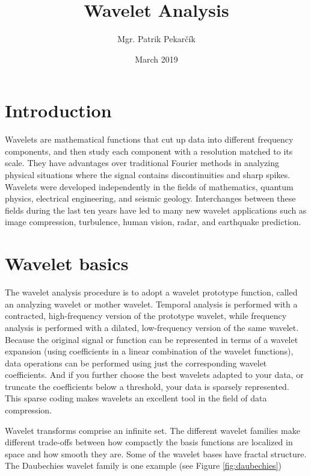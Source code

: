 \documentclass{article}
\title{Wavelet Analysis}
\author{Mgr. Patrik Pekarčík}
\date{March 2019}
\begin{document}
\maketitle

\section{Introduction}
Wavelets are mathematical functions that cut up data into different frequency components, and then study each component with a resolution matched to its scale. 
They have advantages over traditional Fourier methods in analyzing physical situations where the signal contains discontinuities and sharp spikes. 
Wavelets were developed independently in the fields of mathematics, quantum physics, electrical engineering, and seismic geology. 
Interchanges between these fields during the last ten years have led to many new wavelet applications such as image compression, turbulence, human vision, radar, and earthquake prediction. \citep{graps1995introduction}

\section{Wavelet basics}
The wavelet analysis procedure is to adopt a wavelet prototype function, called an analyzing wavelet or mother wavelet.
Temporal analysis is performed with a contracted, high-frequency version of the prototype wavelet, while frequency analysis is performed with a dilated, low-frequency version of the same wavelet. 
Because the original signal or function can be represented in terms of a wavelet expansion (using coefficients in a linear combination of the wavelet functions), data operations can be performed using just the corresponding wavelet coefficients. 
And if you further choose the best wavelets adapted to your data, or truncate the coefficients below a threshold, your data is sparsely represented. 
This sparse coding makes wavelets an excellent tool in the field of data compression.

Wavelet transforms comprise an infinite set. The different wavelet families make different trade-offs
between how compactly the basis functions are localized in space and how smooth they are.
Some of the wavelet bases have fractal structure. The Daubechies wavelet family is one example (see Figure \ref{fig:daubechies})
\end{document}
